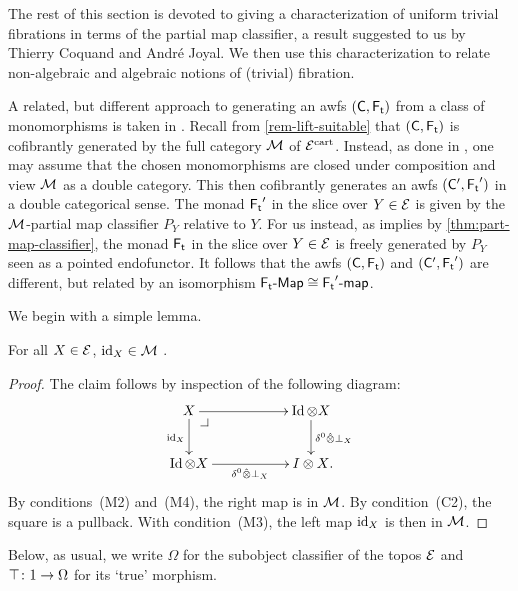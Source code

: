 \documentclass[reqno,10pt,a4paper,oneside,draft]{amsart}
\begin{document}
{{The rest of this section is devoted to giving a characterization of uniform trivial fibrations in terms of the partial map classifier, a result suggested to us by Thierry Coquand and Andr\'e Joyal.
We then use this characterization to relate non-algebraic and algebraic notions of (trivial) fibration.

\begin{remark}
A related, but different approach to generating an awfs $(\CC, \TF)$ from a class of monomorphisms is taken in \cite{bourke-garner-I}.
Recall from \cref{rem-lift-suitable} that $(\CC, \TF)$ is cofibrantly generated by the full category $\cal{M}$ of $\cal{E}^\cart$.
Instead, as done in \cite{bourke-garner-I}, one may assume that the chosen monomorphisms are closed under composition and view $\cal{M}$ as a double category.
This then cofibrantly generates an awfs $(\CC', \TF')$ in a double categorical sense.
The monad $\TF'$ in the slice over $Y \in \cal{E}$ is given by the $\cal{M}$-partial map classifier $P_Y$ relative to $Y$.
For us instead, as implies by \cref{thm:part-map-classifier}, the monad $\TF$ in the slice over $Y \in \cal{E}$ is freely generated by $P_Y$ seen as a pointed endofunctor.
It follows that the awfs $(\CC, \TF)$ and $(\CC', \TF')$ are different, but related by an isomorphism $\pAlg{\TF} \cong \palg{\TF'}$.
\end{remark}

We begin with a simple lemma.

\begin{lemma} \label{identities-in-M}
For all $X \in \cal{E}$, $\id_X \in \cal{M}$ .
\end{lemma}

\begin{proof}
The claim follows by inspection of the following diagram:
\[
\xymatrix@C+3em{
  X
  \ar[r]
  \ar[d]_{\id_X}
  \pullback{dr}
&
  \Id \otimes X
  \ar[d]^{\delta^0 \hatotimes \bot_X}
\\
  \Id \otimes X
  \ar[r]_{\delta^0 \hatotimes \bot_X}
&
  I \otimes X
\rlap{.}}
\]
By conditions~(M2) and~(M4), the right map is in $\cal{M}$.
By condition~(C2), the square is a pullback.
With condition~(M3), the left map $\id_X$ is then in $\cal{M}$.
\end{proof}

Below, as usual, we write $\Omega$ for the subobject classifier of the topos $\cal{E}$ and $\top \co 1 \to \Omega$ for its `true' morphism.

}}
\end{document}
